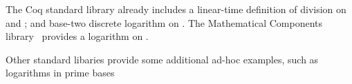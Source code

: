 The Coq standard library already includes a linear-time definition 
of division on  and ; and base-two discrete logarithm 
on .  The Mathematical Components library~\cite{MathComp} 
provides a logarithm on .




Other standard libaries
provide some additional ad-hoc examples, such as logarithms in prime
bases


